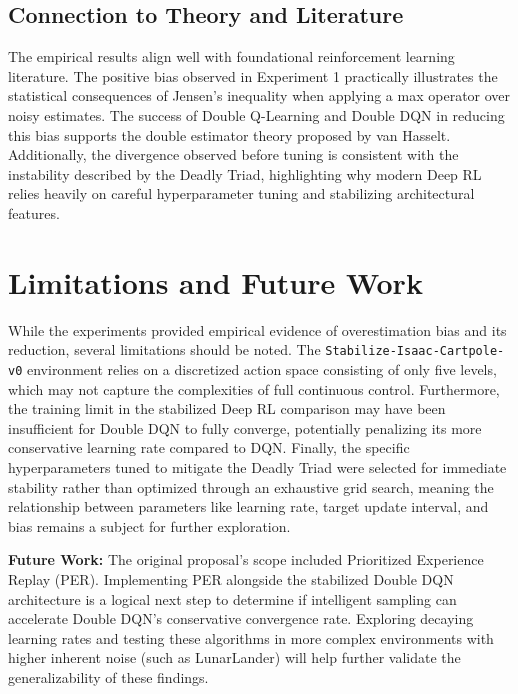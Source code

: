 \documentclass[11pt,a4paper]{article}
\begin{document}
\subsection{Connection to Theory and Literature}
The empirical results align well with foundational reinforcement learning literature. The positive bias observed in Experiment 1 practically illustrates the statistical consequences of Jensen's inequality when applying a max operator over noisy estimates. The success of Double Q-Learning and Double DQN in reducing this bias supports the double estimator theory proposed by van Hasselt. Additionally, the divergence observed before tuning is consistent with the instability described by the Deadly Triad, highlighting why modern Deep RL relies heavily on careful hyperparameter tuning and stabilizing architectural features.

\section{Limitations and Future Work}
While the experiments provided empirical evidence of overestimation bias and its reduction, several limitations should be noted. The \texttt{Stabilize-Isaac-Cartpole-v0} environment relies on a discretized action space consisting of only five levels, which may not capture the complexities of full continuous control. Furthermore, the training limit in the stabilized Deep RL comparison may have been insufficient for Double DQN to fully converge, potentially penalizing its more conservative learning rate compared to DQN. Finally, the specific hyperparameters tuned to mitigate the Deadly Triad were selected for immediate stability rather than optimized through an exhaustive grid search, meaning the relationship between parameters like learning rate, target update interval, and bias remains a subject for further exploration.

\textbf{Future Work:} 
The original proposal's scope included Prioritized Experience Replay (PER). Implementing PER alongside the stabilized Double DQN architecture is a logical next step to determine if intelligent sampling can accelerate Double DQN's conservative convergence rate. Exploring decaying learning rates and testing these algorithms in more complex environments with higher inherent noise (such as LunarLander) will help further validate the generalizability of these findings.

\newpage
\end{document}
